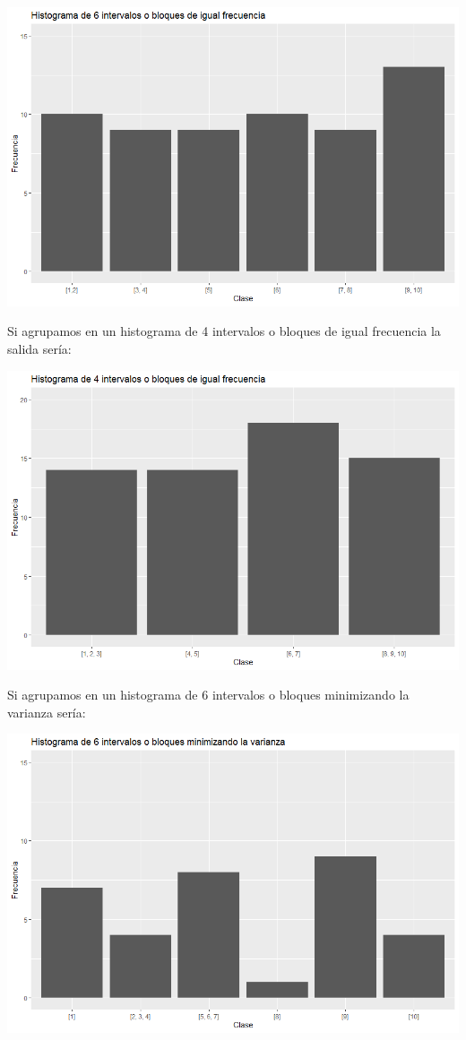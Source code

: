 \documentclass{uimppracticas}
\begin{document}
\begin{center}
	\includegraphics[scale=0.7]{code/exercise_three/hist_1}
\end{center}

Si agrupamos en un histograma de 4 intervalos o bloques de igual frecuencia la salida sería:

\begin{center}
	\includegraphics[scale=0.6]{code/exercise_three/hist_2}
\end{center}

Si agrupamos en un histograma de 6 intervalos o bloques minimizando la varianza sería:

\begin{center}
	\includegraphics[scale=0.7]{code/exercise_three/hist_3}
\end{center}
\end{document}
